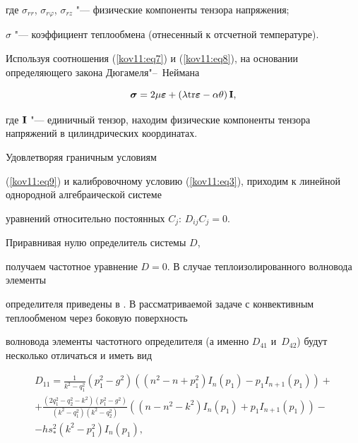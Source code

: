 где $\sigma _{rr}$, $\sigma_{r\varphi}$, $\sigma _{rz}$ "--- физические компоненты тензора напряжения;

$\sigma$ "--- коэффициент теплообмена (отнесенный к отсчетной температуре).



Используя соотношения (\ref{kov11:eq7}) и (\ref{kov11:eq8}), на основании определяющего закона Дюгамеля"--~Неймана


$$

\boldsymbol\sigma=2\mu\boldsymbol\varepsilon+\left(\lambda\rm{tr}\boldsymbol\varepsilon-\alpha\theta\right){\bf{I}},

$$

где ${\bf{I}}$ "--- единичный тензор, находим физические компоненты тензора напряжений в цилиндрических координатах. 

Удовлетворяя граничным условиям

(\ref{kov11:eq9}) и калибровочному условию (\ref{kov11:eq3}), приходим к линейной однородной алгебраической системе

уравнений относительно постоянных $C_j$: $D_{ij}C_j  = 0$. %

Приравнивая нулю определитель системы $D$,

получаем частотное уравнение $D = 0$. В случае теплоизолированного волновода элементы

определителя приведены в \cite{kov11:1}. В рассматриваемой задаче с конвективным теплообменом через боковую поверхность

волновода элементы частотного определителя (а именно $D_{41}$ и~$D_{42}$) будут несколько отличаться и иметь вид

\begin{multline*}

D_{11}=\frac{1}{k^{2}-q_{1}^{2}}(p_{1}^{2}-g^{2})\left((n^{2}-n+p_{1}^{2})I_{n}(p_{1})-p_{1}I_{n+1}(p_{1})

\right)+\\

+\frac{(2q_{1}^{2}-q_{2}^{2}-k^{2})(p_{1}^{2}-g^{2})}{(k^{2}-q_{1}^{2})(k^{2}-q_{2}^{2})}

\left((n-n^{2}-k^{2})I_{n}(p_{1})+p_{1}I_{n+1}(p_{1})\right)-\\

-hs_{*}^{2}(k^{2}-p_{1}^{2})I_{n}(p_{1}),

\end{multline*}

